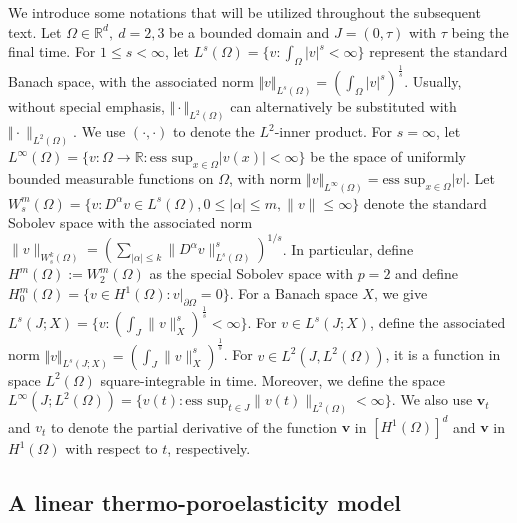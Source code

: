 \documentclass{article}
\numberwithin{equation}{section}
\begin{document}
We introduce some notations that will be utilized throughout the subsequent text.
Let $\Omega\in\mathbb R^d,~d=2,3$ be a bounded domain and $J=(0,\tau)$ with $\tau$ being the final time. 
For $1\le s < \infty$, let $L^s(\Omega)=\{v:\int_\Omega|v|^s<\infty \}$  represent the standard Banach space, with the associated norm $\Vert v\Vert_{L^s(\Omega)}=(\int_\Omega |v|^s)^{\frac1s}$.
Usually, without special emphasis, $\Vert\cdot\Vert_{L^2(\Omega)}$
can alternatively be substituted with $\Vert\cdot\|_{L^2(\Omega)}$. We use $(\cdot,\cdot)$ to denote the $L^2$-inner product. 
For $s=\infty$, 
let $L^\infty(\Omega)=\{ v : \Omega \to \mathbb{R} : \text{ess sup}_{x \in \Omega} |v(x)| < \infty \} $ be the space of uniformly bounded measurable functions on $\Omega$,
with norm $\Vert v\Vert_{L^\infty(\Omega)}= \text{ess sup}_{x \in \Omega} |v|$.
Let $W_s^m(\Omega)=\{ v:D^\alpha v\in L^s(\Omega),0\le |\alpha|\le m,\|v\|\le \infty\}$ denote the standard Sobolev space with the associated norm $\|v\|_{W_s^k(\Omega)}=(\sum_{|\alpha|\le k}\|D^\alpha v\|^s_{L^s(\Omega)})^{1/s}$.
In particular, define $H^m(\Omega):= W_2^m(\Omega)$ as the special Sobolev space with $p=2$ and define
 $H_0^m(\Omega)=\{v\in H^1(\Omega):v|_{\partial \Omega}=0 \}$.
 For a Banach space $X$, we give $L^s(J;X)=\{v: (\int_J\|v\|_{X}^s)^{\frac1s}<\infty\}$.
For $v \in L^s(J;X)$, define the associated norm 
$\Vert v\Vert_{ L^s(J;X)}= (\int_J\|v\|_X^s)^{\frac1s}$.
For $v\in L^2(J,L^2(\Omega))$, it is a function in space $L^2(\Omega)$ square-integrable in time.  
Moreover, we define the space $L^\infty(J;L^2(\Omega))=\{v(t):\text{ess sup}_{t \in J}\|v(t)\|_{L^2(\Omega)}<\infty \}$.
We also use $\bm v_t$ and  $v_t$ to denote the partial derivative of the function $\bm v$ in $[H^1(\Omega)]^d$ and $\bm v$ in $H^1(\Omega)$ with respect to $t$, respectively.
\subsection{A linear thermo-poroelasticity model}
\end{document}
